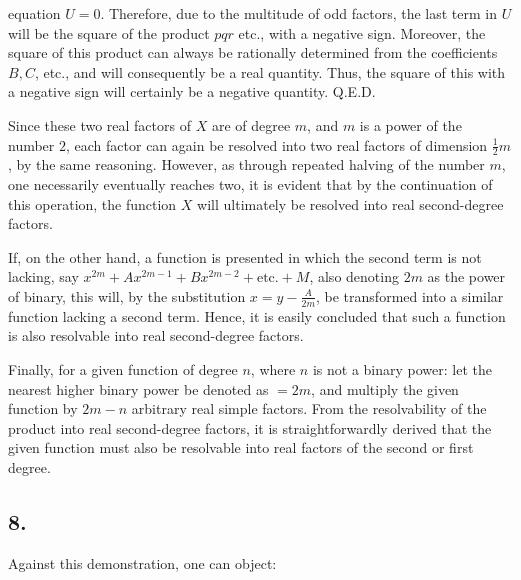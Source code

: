 \documentclass[12pt]{memoir}
\theoremstyle{plain}
\theoremstyle{remark}
\begin{document}
equation \(U = 0\). Therefore, due to the multitude of odd factors, the last term in \(U\) will be the square of the product \(pqr\) etc., with a negative sign. Moreover, the square of this product can always be rationally determined from the coefficients \(B, C\), etc., and will consequently be a real quantity. Thus, the square of this with a negative sign will certainly be a negative quantity. Q.E.D.

Since these two real factors of \(X\) are of degree \(m\), and \(m\) is a power of the number \(2\), each factor can again be resolved into two real factors of dimension \(\tfrac{1}{2}m\), by the same reasoning. However, as through repeated halving of the number \(m\), one necessarily eventually reaches two, it is evident that by the continuation of this operation, the function \(X\) will ultimately be resolved into real second-degree factors.

If, on the other hand, a function is presented in which the second term is not lacking, say \(x^{2m} + A x^{2m-1} + B x^{2m-2} + \text{etc.} + M\), also denoting \(2m\) as the power of binary, this will, by the substitution \(x = y - \frac{A}{2m}\), be transformed into a similar function lacking a second term. Hence, it is easily concluded that such a function is also resolvable into real second-degree factors.

Finally, for a given function of degree \(n\), where \(n\) is not a binary power: let the nearest higher binary power be denoted as \(= 2m\), and multiply the given function by \(2 m - n\) arbitrary real simple factors. From the resolvability of the product into real second-degree factors, it is straightforwardly derived that the given function must also be resolvable into real factors of the second or first degree.

\subsection*{8.}

Against this demonstration, one can object:
\end{document}
